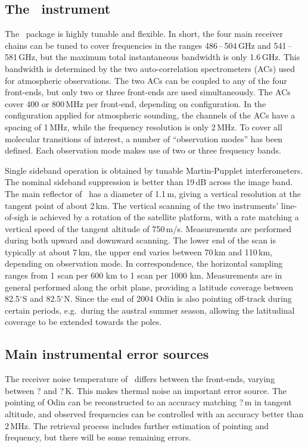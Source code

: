 \subsection{The \SMR\ instrument}
%
The \smr\ package is highly tunable and flexible. In short, the four main
receiver chains can be tuned to cover frequencies in the ranges
486\,--\,504\,GHz and 541\,-- \,581\,GHz, but the maximum total instantaneous
bandwidth is only 1.6\,GHz. This bandwidth is determined by the two
auto-correlation spectrometers (ACs) used for atmospheric observations. The two
ACs can be coupled to any of the four front-ends, but only two or three
front-ends are used simultaneously. The ACs cover 400 or 800\,MHz per
front-end, depending on configuration. In the configuration applied for
atmospheric sounding, the channels of the ACs have a spacing of 1\,MHz, while
the frequency resolution is only 2\,MHz. To cover all molecular transitions of
interest, a number of ``observation modes'' has been defined. Each observation
mode makes use of two or three frequency bands.

Single sideband operation is obtained by tunable Martin-Pupplet
interferometers. The nominal sideband suppression is better than 19\,dB across
the image band. The main reflector of \smr\ has a diameter of 1.1\,m, giving a
vertical resolution at the tangent point of about 2\,km. The vertical scanning
of the two instruments' line-of-sigh is achieved by a rotation of the satellite
platform, with a rate matching a vertical speed of the tangent altitude of
750\,m/s. Measurements are performed during both upward and downward scanning.
The lower end of the scan is typically at about 7\,km, the upper end varies
between 70\,km and 110\,km, depending on observation mode. In correspondence,
the horizontal sampling ranges from 1 scan per 600 km to 1 scan per 1000 km.
Measurements are in general performed along the orbit plane, providing a
latitude coverage between 82.5$^{\circ}$S and 82.5$^{\circ}$N. Since the end of
2004 Odin is also pointing off-track during certain periods, e.g.\ during the
austral summer season, allowing the latitudinal coverage to be extended towards
the poles. 


\subsection{Main instrumental error sources}
%
The receiver noise temperature of \smr\ differs between the front-ends, varying
between ? and ?\,K. This makes thermal noise an important
error source. The pointing of Odin can be reconstructed to an accuracy matching
?\,m in tangent altitude, and observed frequencies can be controlled with an
accuracy better than 2\,MHz. The retrieval process includes further estimation
of pointing and frequency, but there will be some remaining errors.

